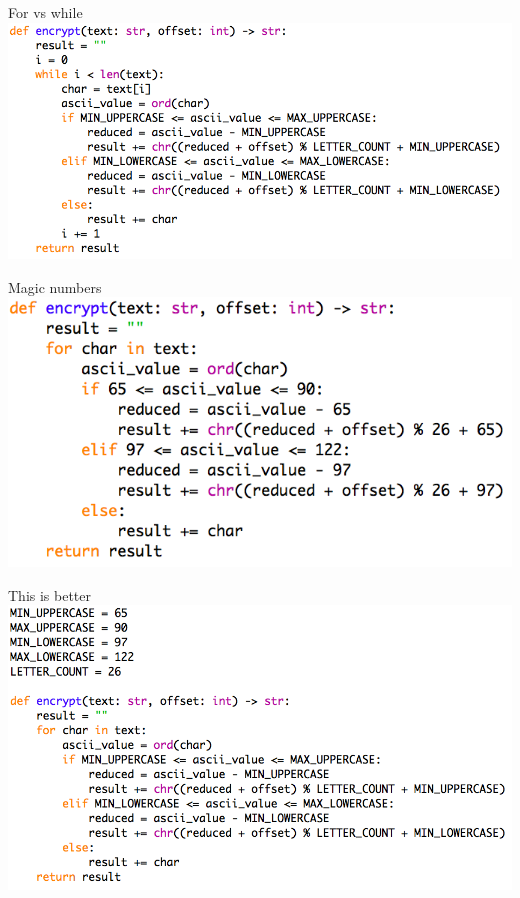 \documentclass[week2]{csse1001}
\begin{document}
\begin{topic}{For vs while}
\includegraphics[width=\textwidth]{a1pitfalls/while}
\end{topic}

\begin{topic}{Magic numbers}
\includegraphics[width=\textwidth]{a1pitfalls/magic}
\end{topic}

\begin{topic}{This is better}
\includegraphics[width=\textwidth]{a1pitfalls/constants}
\end{topic}
\end{document}
